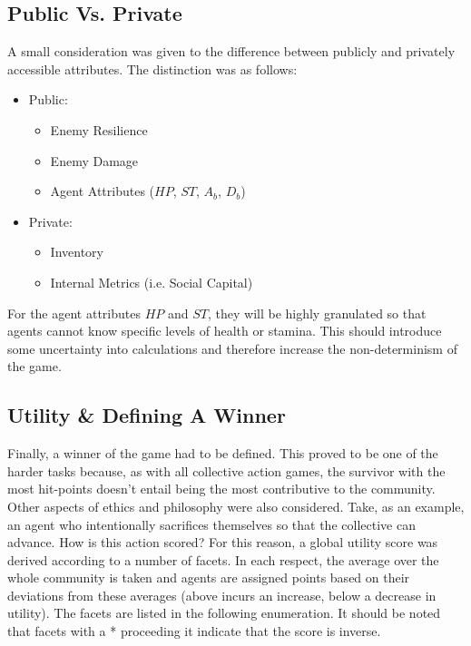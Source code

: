 \subsection{Public Vs. Private}\label{sec:pubpiv}

A small consideration was given to the difference between publicly and privately accessible attributes. The distinction was as follows:

\begin{itemize}
    \item Public:
    \begin{itemize}
        \item Enemy Resilience 
        \item Enemy Damage
        \item Agent Attributes ($HP$, $ST$, $A_b$, $D_b$)
    \end{itemize}
    \item Private:
    \begin{itemize}
        \item Inventory
        \item Internal Metrics (i.e. Social Capital)
    \end{itemize}
\end{itemize}

For the agent attributes $HP$ and $ST$, they will be highly granulated so that agents cannot know specific levels of health or stamina. This should introduce some uncertainty into calculations and therefore increase the non-determinism of the game. 

\subsection{Utility \& Defining A Winner}\label{sec: winner}

Finally, a winner of the game had to be defined. This proved to be one of the harder tasks because, as with all collective action games, the survivor with the most hit-points doesn't entail being the most contributive to the community. Other aspects of ethics and philosophy were also considered. Take, as an example, an agent who intentionally sacrifices themselves so that the collective can advance. How is this action scored? For this reason, a global utility score was derived according to a number of facets. In each respect, the average over the whole community is taken and agents are assigned points based on their deviations from these averages (above incurs an increase, below a decrease in utility). The facets are listed in the following enumeration. It should be noted that facets with a * proceeding it indicate that the score is inverse. 

